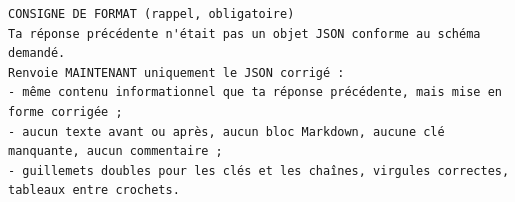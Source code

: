 \begin{lstlisting}[style=adamprompt]
CONSIGNE DE FORMAT (rappel, obligatoire)
Ta réponse précédente n'était pas un objet JSON conforme au schéma demandé.
Renvoie MAINTENANT uniquement le JSON corrigé :
- même contenu informationnel que ta réponse précédente, mais mise en forme corrigée ;
- aucun texte avant ou après, aucun bloc Markdown, aucune clé manquante, aucun commentaire ;
- guillemets doubles pour les clés et les chaînes, virgules correctes, tableaux entre crochets.
\end{lstlisting}
